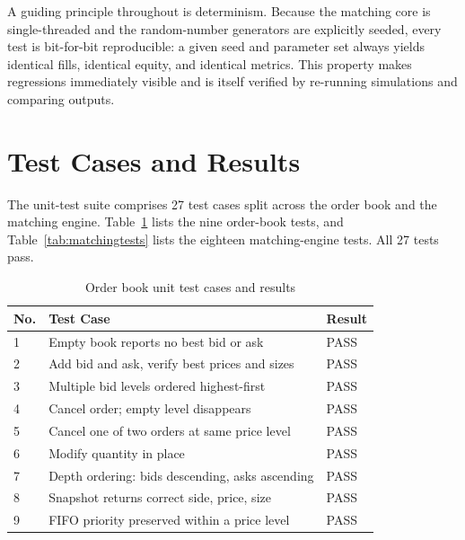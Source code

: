 \documentclass[12pt,oneside,a4paper]{report}
\begin{document}
A guiding principle throughout is determinism. Because the matching core is single-threaded and the random-number generators are explicitly seeded, every test is bit-for-bit reproducible: a given seed and parameter set always yields identical fills, identical equity, and identical metrics. This property makes regressions immediately visible and is itself verified by re-running simulations and comparing outputs.

\section{Test Cases and Results}
\label{sec:testcases}

The unit-test suite comprises 27 test cases split across the order book and the matching engine. Table~\ref{tab:orderbooktests} lists the nine order-book tests, and Table~\ref{tab:matchingtests} lists the eighteen matching-engine tests. All 27 tests pass.

\begin{table}[H]
\centering
\caption{Order book unit test cases and results}
\label{tab:orderbooktests}
\small
\begin{tabular}{p{0.4in}p{3.4in}p{0.9in}}
\toprule
\textbf{No.} & \textbf{Test Case} & \textbf{Result} \\
\midrule
1 & Empty book reports no best bid or ask & PASS \\
2 & Add bid and ask, verify best prices and sizes & PASS \\
3 & Multiple bid levels ordered highest-first & PASS \\
4 & Cancel order; empty level disappears & PASS \\
5 & Cancel one of two orders at same price level & PASS \\
6 & Modify quantity in place & PASS \\
7 & Depth ordering: bids descending, asks ascending & PASS \\
8 & Snapshot returns correct side, price, size & PASS \\
9 & FIFO priority preserved within a price level & PASS \\
\bottomrule
\end{tabular}
\end{table}
\end{document}
